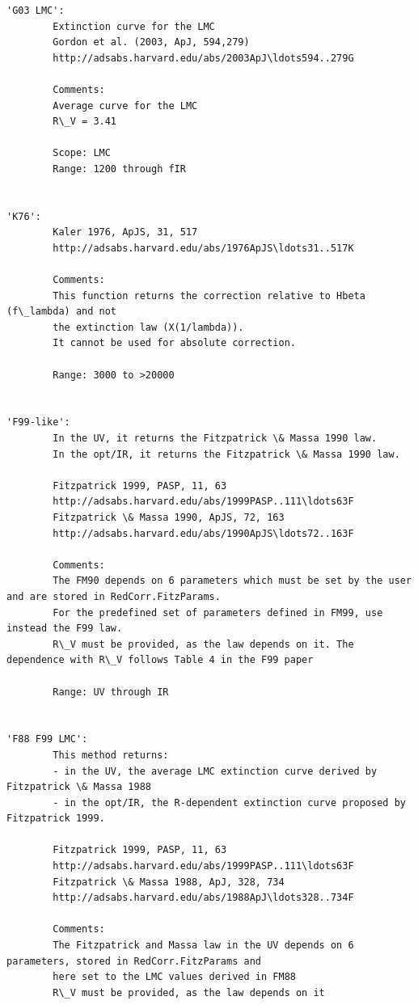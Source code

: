 \documentclass{report}
\begin{document}
    \begin{Verbatim}[commandchars=\\\{\}]
'G03 LMC': 
        Extinction curve for the LMC
        Gordon et al. (2003, ApJ, 594,279)
        http://adsabs.harvard.edu/abs/2003ApJ\ldots594..279G
        
        Comments:
        Average curve for the LMC
        R\_V = 3.41

        Scope: LMC
        Range: 1200 through fIR   

        
'K76': 
        Kaler 1976, ApJS, 31, 517
        http://adsabs.harvard.edu/abs/1976ApJS\ldots31..517K
        
        Comments:
        This function returns the correction relative to Hbeta (f\_lambda) and not
        the extinction law (X(1/lambda)).
        It cannot be used for absolute correction.
        
        Range: 3000 to >20000
        
        
'F99-like': 
        In the UV, it returns the Fitzpatrick \& Massa 1990 law.
        In the opt/IR, it returns the Fitzpatrick \& Massa 1990 law. 
        
        Fitzpatrick 1999, PASP, 11, 63
        http://adsabs.harvard.edu/abs/1999PASP..111\ldots63F
        Fitzpatrick \& Massa 1990, ApJS, 72, 163
        http://adsabs.harvard.edu/abs/1990ApJS\ldots72..163F
        
        Comments:
        The FM90 depends on 6 parameters which must be set by the user and are stored in RedCorr.FitzParams.
        For the predefined set of parameters defined in FM99, use instead the F99 law.
        R\_V must be provided, as the law depends on it. The dependence with R\_V follows Table 4 in the F99 paper 

        Range: UV through IR
        
        
'F88 F99 LMC': 
        This method returns:
        - in the UV, the average LMC extinction curve derived by Fitzpatrick \& Massa 1988
        - in the opt/IR, the R-dependent extinction curve proposed by Fitzpatrick 1999.
        
        Fitzpatrick 1999, PASP, 11, 63
        http://adsabs.harvard.edu/abs/1999PASP..111\ldots63F
        Fitzpatrick \& Massa 1988, ApJ, 328, 734
        http://adsabs.harvard.edu/abs/1988ApJ\ldots328..734F
        
        Comments:
        The Fitzpatrick and Massa law in the UV depends on 6 parameters, stored in RedCorr.FitzParams and 
        here set to the LMC values derived in FM88
        R\_V must be provided, as the law depends on it
        

\end{Verbatim}
\end{document}
